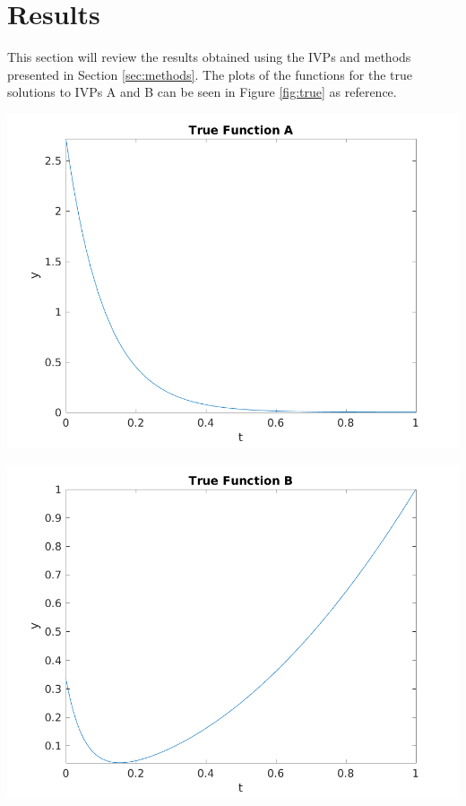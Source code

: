 \documentclass{article}
\begin{document}
\newpage
\section{Results}
\label{sec:results}

This section will review the results obtained using the IVPs and methods presented in Section \ref{sec:methods}. The plots of the functions for the true solutions to IVPs A and B can be seen in Figure \ref{fig:true} as reference.

\begin{center}
	\centering
    \begin{minipage}{0.5\textwidth}
        \centering
	    \includegraphics[width=1.1\textwidth]{../output/a_actual.png}
    \end{minipage}\hfill
    \begin{minipage}{0.5\textwidth}
        \centering
	    \includegraphics[width=1.1\textwidth]{../output/b_actual.png}
    \end{minipage}
 	\label{fig:true}
\end{center}
\end{document}
